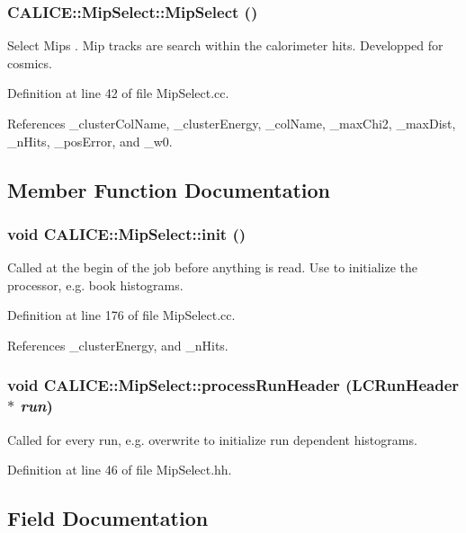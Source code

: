 \subsubsection[{MipSelect}]{\setlength{\rightskip}{0pt plus 5cm}CALICE::MipSelect::MipSelect ()}\label{classCALICE_1_1MipSelect_a187a4421470be1e416ad1aaffabdab45}


Select Mips . Mip tracks are search within the calorimeter hits. Developped for cosmics. 

Definition at line 42 of file MipSelect.cc.

References \_\-clusterColName, \_\-clusterEnergy, \_\-colName, \_\-maxChi2, \_\-maxDist, \_\-nHits, \_\-posError, and \_\-w0.

\subsection{Member Function Documentation}
\subsubsection[{init}]{\setlength{\rightskip}{0pt plus 5cm}void CALICE::MipSelect::init ()}\label{classCALICE_1_1MipSelect_a6e9d97e8a6a621de6803dac121a9662b}


Called at the begin of the job before anything is read. Use to initialize the processor, e.g. book histograms. 

Definition at line 176 of file MipSelect.cc.

References \_\-clusterEnergy, and \_\-nHits.
\subsubsection[{processRunHeader}]{\setlength{\rightskip}{0pt plus 5cm}void CALICE::MipSelect::processRunHeader (LCRunHeader $\ast$ {\em run})\hspace{0.3cm}{\ttfamily  [inline]}}\label{classCALICE_1_1MipSelect_af4ddc35f44aa0c65145e592fba7abb64}


Called for every run, e.g. overwrite to initialize run dependent histograms. 

Definition at line 46 of file MipSelect.hh.

\subsection{Field Documentation}
